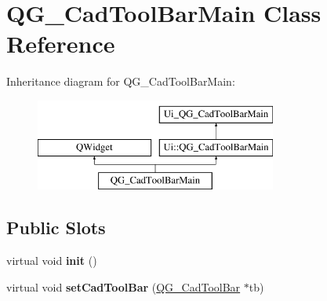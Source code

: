 \hypertarget{classQG__CadToolBarMain}{\section{Q\-G\-\_\-\-Cad\-Tool\-Bar\-Main Class Reference}
\label{classQG__CadToolBarMain}
}
Inheritance diagram for Q\-G\-\_\-\-Cad\-Tool\-Bar\-Main\-:\begin{figure}[H]
\begin{center}
\leavevmode
\includegraphics[height=3.000000cm]{classQG__CadToolBarMain}
\end{center}
\end{figure}
\subsection*{Public Slots}
\begin{DoxyCompactItemize}
\item 
\hypertarget{classQG__CadToolBarMain_a88b13324b404da69d2db81585a5a4b4d}{virtual void {\bfseries init} ()}\label{classQG__CadToolBarMain_a88b13324b404da69d2db81585a5a4b4d}

\item 
\hypertarget{classQG__CadToolBarMain_aad1af14928bcabcaf14070d3ce30eb78}{virtual void {\bfseries set\-Cad\-Tool\-Bar} (\hyperlink{classQG__CadToolBar}{Q\-G\-\_\-\-Cad\-Tool\-Bar} $\ast$tb)}\label{classQG__CadToolBarMain_aad1af14928bcabcaf14070d3ce30eb78}

\end{DoxyCompactItemize}
